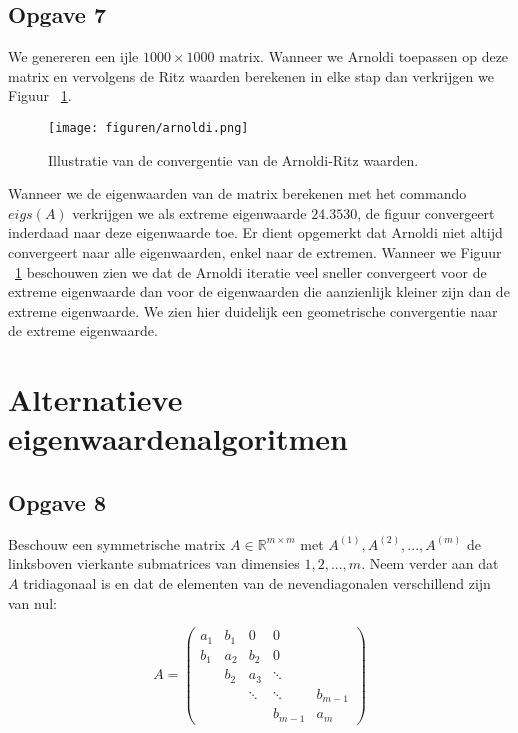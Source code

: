 \documentclass[a4paper, 12pt, titlepage]{report}
\begin{document}
\subsection{Opgave 7}
We genereren een ijle $1000\times 1000$ matrix. Wanneer we Arnoldi toepassen op deze matrix en vervolgens de Ritz waarden berekenen in elke stap dan verkrijgen we Figuur ~\ref{fig:arnoldi}.

\begin{figure}[htb]
	\centering
	\texttt{[image: figuren/arnoldi.png]}
	\caption{Illustratie van de convergentie van de Arnoldi-Ritz waarden.}
	\label{fig:arnoldi}
\end{figure}

Wanneer we de eigenwaarden van de matrix berekenen met het commando $eigs(A)$ verkrijgen we als extreme eigenwaarde $24.3530$, de figuur convergeert inderdaad naar deze eigenwaarde toe. Er dient opgemerkt dat Arnoldi niet altijd convergeert naar alle eigenwaarden, enkel naar de extremen. Wanneer we Figuur  ~\ref{fig:arnoldi} beschouwen zien we dat de Arnoldi iteratie veel sneller convergeert voor de extreme eigenwaarde dan voor de eigenwaarden die aanzienlijk kleiner zijn dan de extreme eigenwaarde. We zien hier duidelijk een geometrische convergentie naar de extreme eigenwaarde. 


\section{Alternatieve eigenwaardenalgoritmen}

\subsection{Opgave 8}
Beschouw een symmetrische matrix $A \in \mathbb{R}^{m \times m}$ met $A^{(1)}, A^{(2)}, ..., A^{(m)}$ de linksboven vierkante submatrices van dimensies $1, 2,...,m$. Neem verder aan dat $A$ tridiagonaal is en dat de elementen van de nevendiagonalen verschillend zijn van nul:

\begin{equation}
	A = \begin{pmatrix} a_1 & b_1 & 0 			& 0 			&					\\ 
											b_1 & a_2 & b_2 		& 0 			&					\\ 
											  	& b_2 & a_3 		& \ddots 	&					\\
												 	&   	& \ddots 	& \ddots 	&	b_{m-1}	\\
												 	&			&					&	b_{m-1}	&	a_m			\end{pmatrix}
\end{equation}
\end{document}

